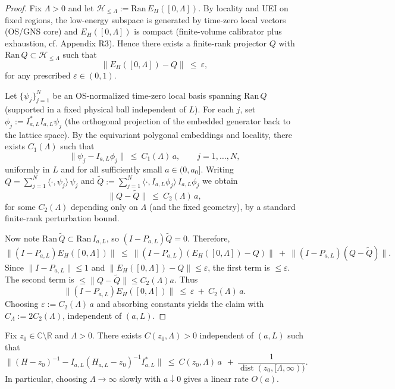 \documentclass[11pt]{amsart}
\begin{document}
\begin{proof}
Fix $\Lambda>0$ and let $\mathcal H_{\le\Lambda}:=\mathrm{Ran}\,E_H([0,\Lambda])$. By locality and UEI on fixed regions, the low-energy subspace is generated by time-zero local vectors (OS/GNS core) and $E_H([0,\Lambda])$ is compact (finite-volume calibrator plus exhaustion, cf. Appendix R3). Hence there exists a finite-rank projector $Q$ with $\mathrm{Ran}\,Q\subset \mathcal H_{\le\Lambda}$ such that
\[
  \|E_H([0,\Lambda]) - Q\|\ \le\ \varepsilon,
\]
for any prescribed $\varepsilon\in(0,1)$.

Let $\{\psi_j\}_{j=1}^N$ be an OS-normalized time-zero local basis spanning $\mathrm{Ran}\,Q$ (supported in a fixed physical ball independent of $L$). For each $j$, set $\phi_j:=I_{a,L}^* I_{a,L}\psi_j$ (the orthogonal projection of the embedded generator back to the lattice space). By the equivariant polygonal embeddings and locality, there exists $C_1(\Lambda)$ such that
\[
  \|\psi_j - I_{a,L}\phi_j\|\ \le\ C_1(\Lambda)\,a,\qquad j=1,\dots,N,
\]
uniformly in $L$ and for all sufficiently small $a\in(0,a_0]$. Writing $Q=\sum_{j=1}^N \langle\cdot,\psi_j\rangle\,\psi_j$ and $\widetilde Q:=\sum_{j=1}^N \langle\cdot, I_{a,L}\phi_j\rangle\,I_{a,L}\phi_j$ we obtain
\[
  \|Q-\widetilde Q\|\ \le\ C_2(\Lambda)\,a,
\]
for some $C_2(\Lambda)$ depending only on $\Lambda$ (and the fixed geometry), by a standard finite-rank perturbation bound.

Now note $\mathrm{Ran}\,\widetilde Q\subset \mathrm{Ran}\,I_{a,L}$, so $(I-P_{a,L})\widetilde Q=0$. Therefore,
\[
  \|(I-P_{a,L})E_H([0,\Lambda])\|
   \ \le\ \|(I-P_{a,L})(E_H([0,\Lambda]) - Q)\|\ +\ \|(I-P_{a,L})(Q-\widetilde Q)\|.
\]
Since $\|I-P_{a,L}\|\le 1$ and $\|E_H([0,\Lambda]) - Q\|\le \varepsilon$, the first term is $\le \varepsilon$. The second term is $\le \|Q-\widetilde Q\|\le C_2(\Lambda) a$. Thus
\[
  \|(I-P_{a,L})E_H([0,\Lambda])\|\ \le\ \varepsilon\ +\ C_2(\Lambda)\,a.
\]
Choosing $\varepsilon:=C_2(\Lambda)\,a$ and absorbing constants yields the claim with $C_\Lambda:=2 C_2(\Lambda)$, independent of $(a,L)$.
\end{proof}

\begin{theorem}\label{thm:nrc-quant}
Fix $z_0\in\mathbb C\setminus\mathbb R$ and $\Lambda>0$. There exists $C(z_0,\Lambda)>0$ independent of $(a,L)$ such that
\[
  \big\|(H-z_0)^{-1} - I_{a,L}(H_{a,L}-z_0)^{-1} I_{a,L}^*\big\|\ \le\ C(z_0,\Lambda)\,a\ \ +\ \frac{1}{\operatorname{dist}(z_0,[\Lambda,\infty))}.
\]
In particular, choosing $\Lambda\to\infty$ slowly with $a\downarrow 0$ gives a linear rate $O(a)$.
\end{theorem}
\end{document}
